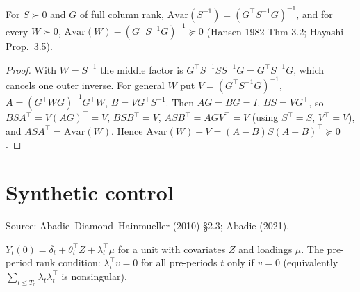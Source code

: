 \begin{theorem}
\label{thm:gmm-efficient}
\leanok
{}
For $S\succ0$ and $G$ of full column rank, $\mathrm{Avar}(S^{-1}) = (G^\top S^{-1}G)^{-1}$, and for every $W\succ0$,
$\mathrm{Avar}(W) - (G^\top S^{-1}G)^{-1}\succeq 0$ (Hansen 1982 Thm 3.2; Hayashi Prop.~3.5).
\end{theorem}
\begin{proof}
\leanok
With $W = S^{-1}$ the middle factor is $G^\top S^{-1}SS^{-1}G = G^\top S^{-1}G$, which cancels one outer inverse. For
general $W$ put $V = (G^\top S^{-1}G)^{-1}$, $A = (G^\top WG)^{-1}G^\top W$, $B = VG^\top S^{-1}$. Then $AG = BG = I$,
$BS = VG^\top$, so $BSA^\top = V(AG)^\top = V$, $BSB^\top = V$, $ASB^\top = AG V^\top = V$ (using $S^\top = S$,
$V^\top = V$), and $ASA^\top = \mathrm{Avar}(W)$. Hence $\mathrm{Avar}(W) - V = (A-B)S(A-B)^\top\succeq0$.
\end{proof}

\section{Synthetic control}
\label{sec:synth}

Source: Abadie--Diamond--Hainmueller (2010) \S2.3; Abadie (2021).

\begin{definition}
\label{def:factor-model}
\leanok
$Y_t(0) = \delta_t + \theta_t^\top Z + \lambda_t^\top\mu$ for a unit with covariates $Z$ and loadings $\mu$. The
pre-period rank condition: $\lambda_t^\top v = 0$ for all pre-periods $t$ only if $v = 0$ (equivalently
$\sum_{t\le T_0}\lambda_t\lambda_t^\top$ is nonsingular).
\end{definition}

